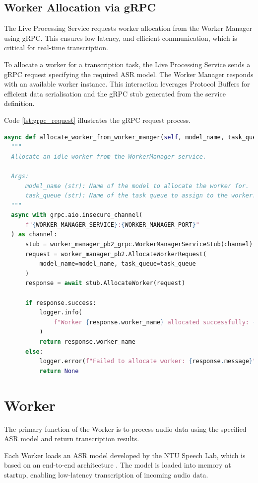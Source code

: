 \subsection{Worker Allocation via gRPC}
The Live Processing Service requests worker allocation from the Worker Manager using gRPC. This ensures low latency, and efficient communication, which is critical for real-time transcription.

To allocate a worker for a transcription task, the Live Processing Service sends a gRPC request specifying the required ASR model. The Worker Manager responds with an available worker instance. This interaction leverages Protocol Buffers for efficient data serialisation and the gRPC stub generated from the service definition.

Code \ref{lst:grpc_request} illustrates the gRPC request process.

\begin{lstlisting}[language=python, caption={gRPC Request for Worker Allocation}, label={lst:grpc_request}]
async def allocate_worker_from_worker_manger(self, model_name, task_queue):
  """
  Allocate an idle worker from the WorkerManager service.

  Args:
      model_name (str): Name of the model to allocate the worker for.
      task_queue (str): Name of the task queue to assign to the worker.
  """
  async with grpc.aio.insecure_channel(
      f"{WORKER_MANAGER_SERVICE}:{WORKER_MANAGER_PORT}"
  ) as channel:
      stub = worker_manager_pb2_grpc.WorkerManagerServiceStub(channel)
      request = worker_manager_pb2.AllocateWorkerRequest(
          model_name=model_name, task_queue=task_queue
      )
      response = await stub.AllocateWorker(request)

      if response.success:
          logger.info(
              f"Worker {response.worker_name} allocated successfully: {response.message}"
          )
          return response.worker_name
      else:
          logger.error(f"Failed to allocate worker: {response.message}")
          return None
\end{lstlisting}


\section{Worker}
The primary function of the Worker is to process audio data using the specified ASR model and return transcription results.  

Each Worker loads an ASR model developed by the NTU Speech Lab, which is based on an end-to-end architecture \cite{chng}. The model is loaded into memory at startup, enabling low-latency transcription of incoming audio data.

